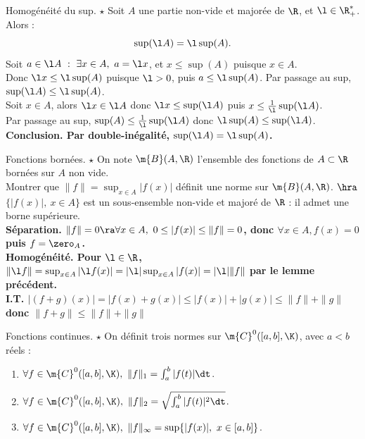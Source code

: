 \documentclass[11pt]{article}
\begin{document}
\begin{lemme}{Homogénéité du sup. $\star$}{}
    Soit $A$ une partie non-vide et majorée de $\R$, et $\l\in\R_+^*$. Alors :
    \begin{equation*}
        \sup(\l A) = \l\sup(A).
    \end{equation*}
    \tcblower
    \boxed{\leq} Soit $a \in \l A ~ : ~ \exists x \in A, ~ a = \l x$, et $x\leq \sup(A)$ puisque $x\in A$.\\
    Donc $\l x \leq \l \sup(A)$ puisque $\l>0$, puis $a \leq \l \sup(A)$. Par passage au sup, $\sup(\l A) \leq \l \sup(A)$.\\
    \boxed{\geq} Soit $x\in A$, alors $\l x \in \l A$ donc $\l x \leq \sup(\l A)$ puis $x \leq \frac{1}{\l}\sup(\l A)$.\\
    Par passage au sup, $\sup(A) \leq \frac{1}{\l}\sup(\l A)$ donc $\l\sup(A) \leq \sup(\l A)$.\\
    \bf{Conclusion.} Par double-inégalité, $\sup(\l A) = \l\sup(A)$. 
\end{lemme}

\vspace*{-0.8cm}

\begin{exi}{Fonctions bornées. $\star$}{}
    On note $\m{B}(A,\R)$ l'ensemble des fonctions de $A\subset \R$ bornées sur $A$ non vide.\\
    Montrer que $\|f\|=\sup_{x\in A}|f(x)|$ définit une norme sur $\m{B}(A,\R)$.
    \tcblower 
    $\hra$ $\{|f(x)|, ~ x \in A\}$ est un sous-ensemble non-vide et majoré de $\R$ : il admet une borne supérieure.\\
    \bf{Séparation.} $\|f\|=0\ra\forall x \in A, ~ 0 \leq |f(x)| \leq \|f\|=0$, donc $\forall x \in A, f(x)=0$ puis $f=\zero_A$.\\
    \bf{Homogénéité.} Pour $\l\in\R$, $\|\l f\| = \sup_{x\in A}|\l f(x)| = |\l|\sup_{x\in A}|f(x)| = |\l|\|f\|$ par le lemme précédent.\\
    \bf{I.T.} $|(f+g)(x)|=|f(x)+g(x)|\leq|f(x)|+|g(x)|\leq \|f\|+\|g\|$ donc $\|f+g\|\leq\|f\|+\|g\|$    
\end{exi}

\vspace*{-0.8cm}

\begin{exi}{Fonctions continues. $\star$}{}
    On définit trois normes sur $\m{C}^0([a,b],\K)$, avec $a<b$ réels :
    \begin{enumerate}
        \item $\forall f \in \m{C}^0([a,b],\K), ~ \|f\|_1=\int_a^b|f(t)|\dt$.
        \item $\forall f \in \m{C}^0([a,b],\K), ~ \|f\|_2=\sqrt{\int_a^b|f(t)|^2\dt}$.
        \item $\forall f \in \m{C}^0([a,b],\K), ~ \|f\|_\infty=\sup\{|f(x)|, ~ x\in[a,b]\}$.
    \end{enumerate}
\end{exi}
\end{document}
